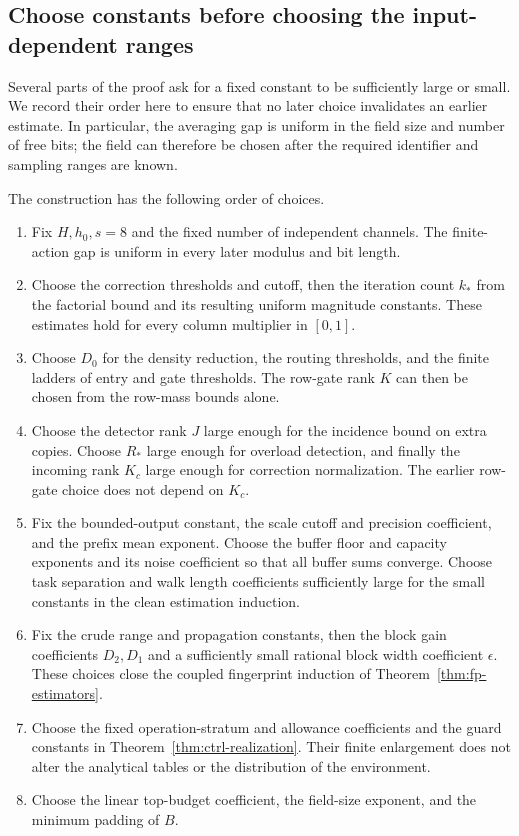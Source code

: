 \subsection{Choose constants before choosing the input-dependent ranges}
\label{subsec:final-constants}

Several parts of the proof ask for a fixed constant to be sufficiently large or small. We record their order here to ensure that no later choice invalidates an earlier estimate. In particular, the averaging gap is uniform in the field size and number of free bits; the field can therefore be chosen after the required identifier and sampling ranges are known.

The construction has the following order of choices.
\begin{enumerate}
\item Fix $H,h_0,s=8$ and the fixed number of independent channels.
The finite-action gap is uniform in every later modulus and bit length.
\item Choose the correction thresholds and cutoff, then the iteration
count $k_*$ from the factorial bound and its resulting uniform
magnitude constants. These estimates hold for every column multiplier
in $[0,1]$.
\item Choose $D_0$ for the density reduction, the routing thresholds,
and the finite ladders of entry and gate thresholds. The row-gate
rank $K$ can then be chosen from the row-mass bounds alone.
\item Choose the detector rank $J$ large enough for the incidence
bound on extra copies. Choose $R_*$ large enough for overload
detection, and finally the incoming rank $K_c$ large enough for
correction normalization. The earlier row-gate choice does not depend
on $K_c$.
\item Fix the bounded-output constant, the scale cutoff and precision
coefficient, and the prefix mean exponent. Choose the buffer
floor and capacity exponents and its noise coefficient so that all
buffer sums converge. Choose task separation and walk length
coefficients sufficiently large for the small constants in the
clean estimation induction.
\item Fix the crude range and propagation constants, then the block
gain coefficients $D_2,D_1$ and a sufficiently small rational block
width coefficient $\epsilon$. These choices close the coupled
fingerprint induction of Theorem~\ref{thm:fp-estimators}.
\item Choose the fixed operation-stratum and allowance coefficients
and the guard constants in Theorem~\ref{thm:ctrl-realization}.
Their finite enlargement does not alter the analytical tables or
the distribution of the environment.
\item Choose the linear top-budget coefficient, the field-size
exponent, and the minimum padding of $B$.
\end{enumerate}
